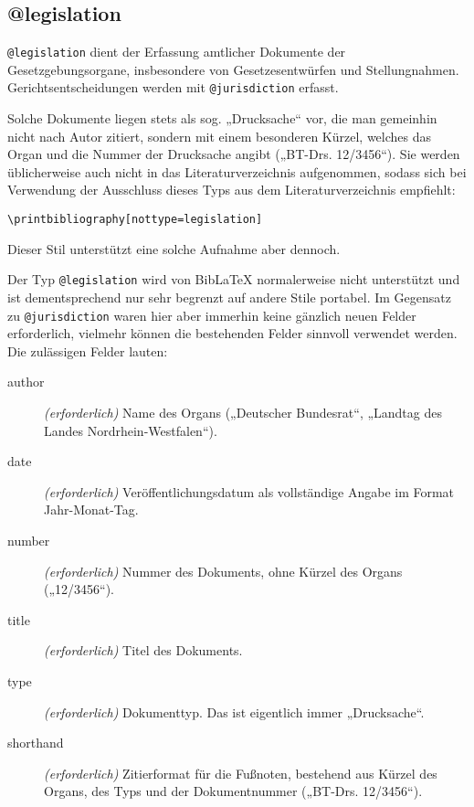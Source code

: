 \documentclass[11pt,a4paper,DIV=calc]{scrartcl}
\newcommand\software[1]{\textsf{#1}}
\newcommand\Biblatex{\software{Bib\LaTeX{}}\xspace}
\begin{document}
\subsection{@legislation}

\verb+@legislation+ dient der Erfassung amtlicher Dokumente der
Gesetzgebungsorgane, insbesondere von Gesetzesentwürfen und
Stellungnahmen. Gerichtsentscheidungen werden mit \verb+@jurisdiction+
erfasst.

Solche Dokumente liegen stets als sog. „Drucksache“ vor, die man
gemeinhin nicht nach Autor zitiert, sondern mit einem besonderen
Kürzel, welches das Organ und die Nummer der Drucksache angibt
(„BT-Drs. 12/3456“). Sie werden üblicherweise auch nicht in das
Literaturverzeichnis aufgenommen, sodass sich bei Verwendung der
Ausschluss dieses Typs aus dem Literaturverzeichnis empfiehlt:

\begin{verbatim}
\printbibliography[nottype=legislation]
\end{verbatim}

Dieser Stil unterstützt eine solche Aufnahme aber dennoch.

Der Typ \verb+@legislation+ wird von \Biblatex normalerweise nicht
unterstützt und ist dementsprechend nur sehr begrenzt auf andere Stile
portabel. Im Gegensatz zu \verb+@jurisdiction+ waren hier aber
immerhin keine gänzlich neuen Felder erforderlich, vielmehr können die
bestehenden Felder sinnvoll verwendet werden. Die zulässigen Felder
lauten:

\begin{description}
\item[author] \emph{(erforderlich)} Name des Organs („Deutscher
  Bundesrat“, „Landtag des Landes Nordrhein-Westfalen“).
\item[date] \emph{(erforderlich)} Veröffentlichungsdatum als
  vollständige Angabe im Format Jahr-Monat-Tag.
\item[number] \emph{(erforderlich)} Nummer des Dokuments, ohne Kürzel
  des Organs („12/3456“).
\item[title] \emph{(erforderlich)} Titel des Dokuments.
\item[type] \emph{(erforderlich)} Dokumenttyp. Das ist eigentlich
  immer „Drucksache“.
\item[shorthand] \emph{(erforderlich)} Zitierformat für die Fußnoten,
  bestehend aus Kürzel des Organs, des Typs und der Dokumentnummer
  („BT-Drs. 12/3456“).
\end{description}
\end{document}
